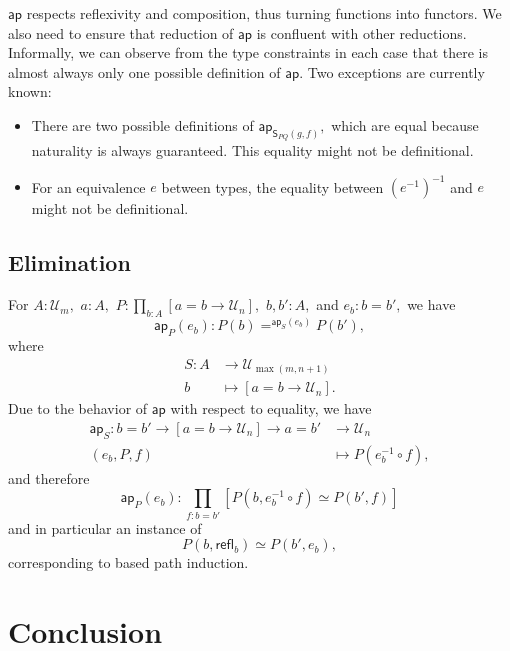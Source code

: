 \documentclass[a4paper]{article}
\theoremstyle{definition}
\theoremstyle{remark}
\renewcommand{\equiv}{\simeq}
\newcommand{\pathOver}[1]{=^{#1}}
\newcommand{\univVar}{\mathcal}
\newcommand{\U}{\univVar{U}}
\newcommand{\0}{\primType{0}}
\newcommand{\1}{\primType{1}}
\newcommand{\2}{\primType{2}}
\newcommand{\nm}{\mathsf}
\newcommand{\refl}{\nm{refl}}
\newcommand{\ap}{\nm{ap}}
\newcommand{\combinator}{\nm}
\newcommand{\revSubstFun}{\combinator{S}}
\begin{document}
$\ap$ respects reflexivity and composition, thus turning functions into functors. We also need to
ensure that reduction of $\ap$ is confluent with other reductions. Informally, we can observe from
the type constraints in each case that there is almost always only one possible definition of
$\ap.$ Two exceptions are currently known:
\begin{itemize}
  \item There are two possible definitions of $\ap_{\revSubstFun_{PQ}(g,f)},$ which are equal
  because naturality is always guaranteed. This equality might not be definitional.
  \item For an equivalence $e$ between types, the equality between $(e^{-1})^{-1}$ and $e$ might
  not be definitional.
\end{itemize}

\subsection{Elimination}

For $A : \U_m,$ $a : A,$ $P : \prod_{b : A} [a = b \to \U_n],$ $b,b' : A,$ and $e_b : b = b',$ we
have
\[\ap_P(e_b) : P(b) \pathOver{\ap_S(e_b)} P(b'),\]
where
\begin{align*}
  S : A &\to     \U_{\max(m,n+1)}\\
      b &\mapsto [a = b \to \U_n].
\end{align*}
Due to the behavior of $\ap$ with respect to equality, we have
\begin{align*}
  \ap_S : b = b' \to [a = b \to \U_n] \to a = b' &\to     \U_n\\
          (e_b,P,f)                              &\mapsto P(e_b^{-1} \circ f),
\end{align*}
and therefore
\[\ap_P(e_b) : \prod_{f : b = b'} [P(b,e_b^{-1} \circ f) \equiv P(b',f)]\]
and in particular an instance of
\[P(b,\refl_b) \equiv P(b',e_b),\]
corresponding to based path induction.

\section{Conclusion}
\end{document}
